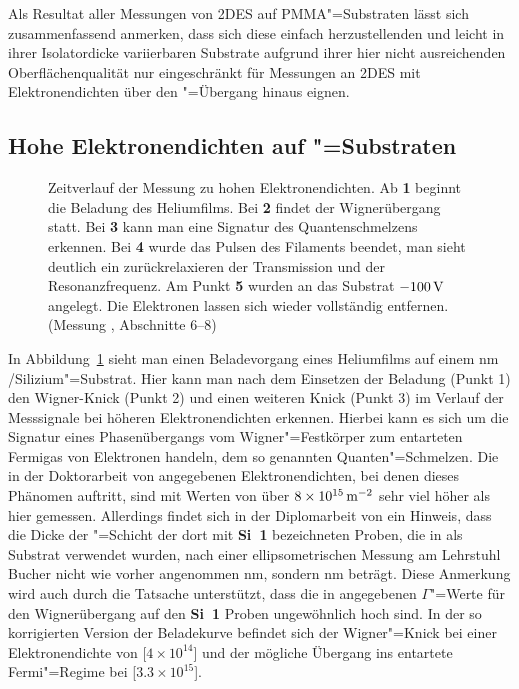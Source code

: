 Als Resultat aller Messungen von 2DES auf PMMA"=Substraten lässt sich zusammenfassend anmerken, dass sich diese einfach herzustellenden und leicht in ihrer Isolatordicke variierbaren Substrate aufgrund ihrer hier nicht ausreichenden Oberflächenqualität nur eingeschränkt für Messungen an 2DES mit Elektronendichten über den "=Übergang hinaus eignen.

\subsection{Hohe Elektronendichten auf \SiO"=Substraten}
\enlargethispage{\baselineskip}

\begin{figure}[h!tb]
    \hfill%
    \begin{minipage}[b]{\textwidth-\midwidth-\tabcolsep}
        \caption[Hohe Elektronendichten auf \SiO, Zeitverlauf]{Zeitverlauf der Messung zu hohen Elektronendichten. Ab {\bfseries 1} beginnt die Beladung des Heliumfilms. Bei {\bfseries 2} findet der Wignerübergang statt. Bei {\bfseries 3} kann man eine Signatur des Quantenschmelzens erkennen. Bei {\bfseries 4} wurde das Pulsen des Filaments beendet, man sieht deutlich ein zurückrelaxieren der Transmission und der Resonanzfrequenz. Am Punkt {\bfseries 5} wurden an das Substrat $\unit[-100]{V}$ angelegt. Die Elektronen lassen sich wieder vollständig entfernen. (Messung , Abschnitte 6--8)}
        \label{fig:quantum_time}
    \end{minipage}
\end{figure}

In Abbildung~\ref{fig:quantum_time} sieht man einen Beladevorgang eines Heliumfilms auf einem \unit[200]{nm} \SiO/Sili\-zi\-um"=Substrat. Hier kann man nach dem Einsetzen der Beladung (Punkt 1) den Wigner-Knick (Punkt 2) und einen weiteren Knick (Punkt 3) im Verlauf der Messsignale bei höheren Elektronendichten erkennen. Hierbei kann es sich um die Signatur eines Phasenübergangs vom Wigner"=Festkörper zum entarteten Fermigas von Elektronen handeln, dem so genannten Quanten"=Schmelzen. Die in der Doktorarbeit von  \cite{guenzler} angegebenen Elektronendichten, bei denen dieses Phänomen auftritt, sind mit Werten von über $\unit[8\times10^{15}]{\Em}$ sehr viel höher als hier gemessen. Allerdings findet sich in der Diplomarbeit von  \cite{bitnar} ein Hinweis, dass die Dicke der \SiO"=Schicht der dort mit {\bfseries Si~1}  bezeichneten Proben, die in \cite{guenzler,bitnar,Gue96} als Substrat verwendet wurden, nach einer ellipsometrischen Messung am Lehrstuhl Bucher nicht wie vorher angenommen \unit[100]{nm}, sondern \unit[262]{nm} beträgt. Diese Anmerkung wird auch durch die Tatsache unterstützt, dass die in \cite{guenzler} angegebenen $\Gamma$"=Werte für den Wignerübergang auf den {\bfseries Si~1} Proben ungewöhnlich hoch sind. In der so korrigierten Version der Beladekurve befindet sich der Wigner"=Knick bei einer Elektronendichte von \unit[$4\times10^{14}$]{\Em} und der mögliche Übergang ins entartete Fermi"=Regime bei \unit[$3.3\times10^{15}$]{\Em}.

